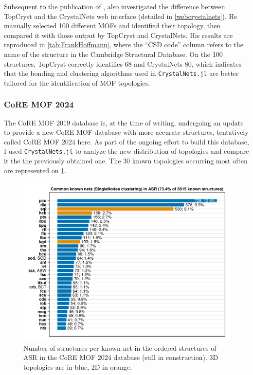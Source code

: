 \documentclass[main.tex]{subfiles}
\begin{document}
Subsequent to the publication of \cite{CrystalNets}, \textcite{FrankHoffmann} also investigated the difference between TopCryst and the CrystalNets web interface (detailed in \cref{webcrystalnets}). He manually selected \num{100} different MOFs and identified their topology, then compared it with those output by TopCryst and CrystalNets. His results are reproduced in \cref{tab:FrankHoffmann}, where the ``CSD code'' column refers to the name of the structure in the Cambridge Structural Database\autocite{CSD}. On the \num{100} structures, TopCryst correctly identifies \num{68} and CrystalNets \num{80}, which indicates that the bonding and clustering algorithms used in \texttt{CrystalNets.jl} are better tailored for the identification of MOF topologies.

\subsubsection{CoRE MOF 2024}

The CoRE MOF 2019 database is, at the time of writing, undergoing an update to provide a new CoRE MOF database with more accurate structures, tentatively called CoRE MOF 2024 here. As part of the ongoing effort to build this database, I used \texttt{CrystalNets.jl} to analyze the new distribution of topologies and compare it the the previously obtained one. The 30 known topologies occurring most often are represented on \cref{fig:CoREMOF2024}.

\begin{figure}
	\centering
	\includegraphics[width=\linewidth]{figures/topology/CoREMOF2024.pdf}
	\caption{Number of structures per known net in the ordered structures of ASR in the CoRE MOF 2024 database (still in construction). 3D topologies are in blue, 2D in orange.}\label{fig:CoREMOF2024}
\end{figure}
\end{document}
